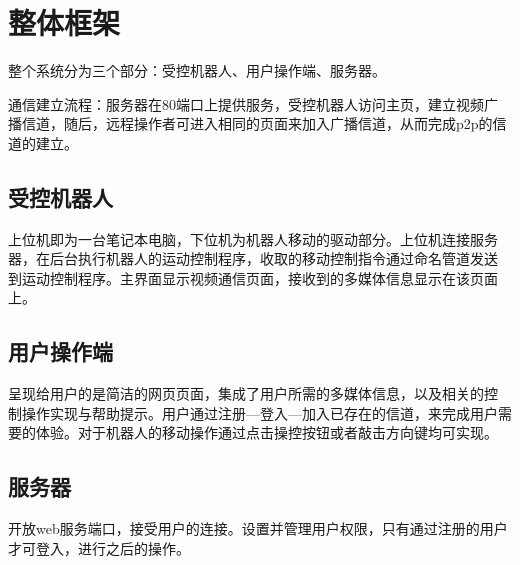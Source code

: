 \chapter{整体框架}

整个系统分为三个部分：受控机器人、用户操作端、服务器。

通信建立流程：服务器在80端口上提供服务，受控机器人访问主页，建立视频广
播信道，随后，远程操作者可进入相同的页面来加入广播信道，从而完成p2p的信
道的建立。

\section{受控机器人}

上位机即为一台笔记本电脑，下位机为机器人移动的驱动部分。上位机连接服务
器，在后台执行机器人的运动控制程序，收取的移动控制指令通过命名管道发送
到运动控制程序。主界面显示视频通信页面，接收到的多媒体信息显示在该页面
上。

\section{用户操作端}

呈现给用户的是简洁的网页页面，集成了用户所需的多媒体信息，以及相关的控
制操作实现与帮助提示。用户通过注册—登入—加入已存在的信道，来完成用户需
要的体验。对于机器人的移动操作通过点击操控按钮或者敲击方向键均可实现。

\section{服务器}

开放web服务端口，接受用户的连接。设置并管理用户权限，只有通过注册的用户
才可登入，进行之后的操作。
